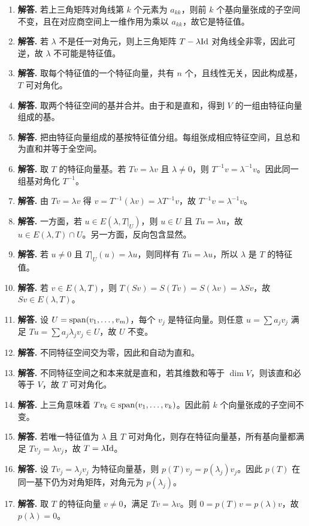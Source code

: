 \begin{enumerate}[label=\textbf{\arabic*.}, leftmargin=*, itemsep=1em]
\item \textbf{解答.} 若上三角矩阵对角线第 $k$ 个元素为 $a_{kk}$，则前 $k$ 个基向量张成的子空间不变，且在对应商空间上一维作用为乘以 $a_{kk}$，故它是特征值。
\item \textbf{解答.} 若 $\lambda$ 不是任一对角元，则上三角矩阵 $T-\lambda\mathrm{Id}$ 对角线全非零，因此可逆，故 $\lambda$ 不可能是特征值。
\item \textbf{解答.} 取每个特征值的一个特征向量，共有 $n$ 个，且线性无关，因此构成基，$T$ 可对角化。
\item \textbf{解答.} 取两个特征空间的基并合并。由于和是直和，得到 $V$ 的一组由特征向量组成的基。
\item \textbf{解答.} 把由特征向量组成的基按特征值分组。每组张成相应特征空间，且总和为直和并等于全空间。
\item \textbf{解答.} 取 $T$ 的特征向量基。若 $Tv=\lambda v$ 且 $\lambda\neq 0$，则 $T^{-1}v=\lambda^{-1}v$。因此同一组基对角化 $T^{-1}$。
\item \textbf{解答.} 由 $Tv=\lambda v$ 得 $v=T^{-1}(\lambda v)=\lambda T^{-1}v$，故 $T^{-1}v=\lambda^{-1}v$。
\item \textbf{解答.} 一方面，若 $u\in E(\lambda,T|_U)$，则 $u\in U$ 且 $Tu=\lambda u$，故 $u\in E(\lambda,T)\cap U$。另一方面，反向包含显然。
\item \textbf{解答.} 若 $u\neq 0$ 且 $T|_U(u)=\lambda u$，则同样有 $Tu=\lambda u$，所以 $\lambda$ 是 $T$ 的特征值。
\item \textbf{解答.} 若 $v\in E(\lambda,T)$，则 $T(Sv)=S(Tv)=S(\lambda v)=\lambda Sv$，故 $Sv\in E(\lambda,T)$。
\item \textbf{解答.} 设 $U=\operatorname{span}(v_1,\dots,v_m)$，每个 $v_j$ 是特征向量。则任意 $u=\sum a_jv_j$ 满足 $Tu=\sum a_j\lambda_jv_j\in U$，故 $U$ 不变。
\item \textbf{解答.} 不同特征空间交为零，因此和自动为直和。
\item \textbf{解答.} 不同特征空间之和本来就是直和，若其维数和等于 $\dim V$，则该直和必等于 $V$，故 $T$ 可对角化。
\item \textbf{解答.} 上三角意味着 $Tv_k\in\operatorname{span}(v_1,\dots,v_k)$。因此前 $k$ 个向量张成的子空间不变。
\item \textbf{解答.} 若唯一特征值为 $\lambda$ 且 $T$ 可对角化，则存在特征向量基，所有基向量都满足 $Tv_j=\lambda v_j$，故 $T=\lambda\mathrm{Id}$。
\item \textbf{解答.} 设 $Tv_j=\lambda_jv_j$ 为特征向量基，则 $p(T)v_j=p(\lambda_j)v_j$。因此 $p(T)$ 在同一基下仍为对角矩阵，对角元为 $p(\lambda_j)$。
\item \textbf{解答.} 取 $T$ 的特征向量 $v\neq 0$，满足 $Tv=\lambda v$。则 $0=p(T)v=p(\lambda)v$，故 $p(\lambda)=0$。

\end{enumerate}
